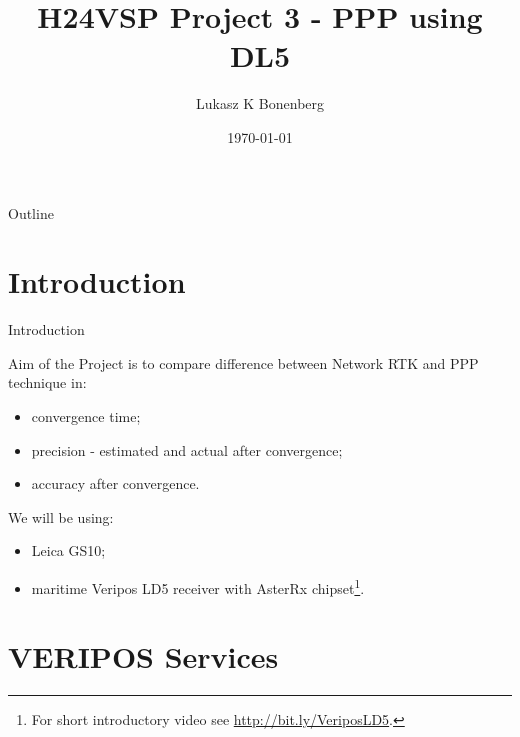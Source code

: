 \documentclass[11pt]{beamer}
\title[H24VSP]{H24VSP Project 3 - PPP using DL5}
\author{Lukasz K Bonenberg}
\institute{NGI}
\date{\today}
\begin{document}
	

\begin{frame}
	\titlepage
\end{frame}

\begin{frame}{Outline}
	\tableofcontents
\end{frame}


\section{Introduction}

\begin{frame}{Introduction}
	
	Aim of the Project is to compare difference between Network RTK and PPP technique in:
	\begin{itemize}
		\item convergence time;
		\item precision - estimated and actual after convergence; 
		\item accuracy after convergence.
	\end{itemize}
	
	 We will be using:
	 	\begin{itemize}
	 		\item Leica GS10;
	 		\item maritime Veripos LD5 receiver with AsterRx chipset\footnote[frame]{For short introductory video see \url{http://bit.ly/VeriposLD5}.}.
	 	\end{itemize}


\end{frame}


\section{VERIPOS Services}
\end{document}
